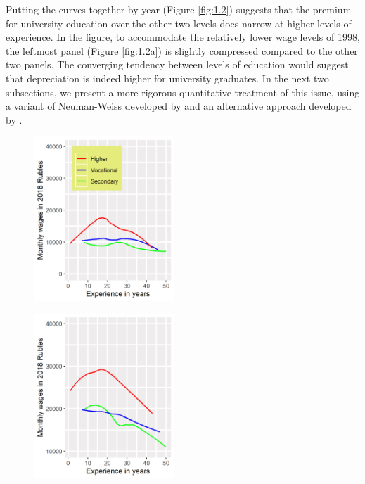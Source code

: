 \documentclass[alpha-refs]{wiley-article-02b}
\begin{document}
Putting the curves together by year (Figure \ref{fig:1.2}) suggests that 
the premium for university education over the other two levels does narrow 
at higher levels of experience. In the figure, to accommodate the 
relatively lower wage levels of 1998, the leftmost panel (Figure 
\ref{fig:1.2a}) is slightly compressed compared to the other two panels. 
The  converging tendency between levels of education would suggest that 
depreciation is indeed higher for university graduates. In the next two 
subsections, we present a more rigorous quantitative treatment of this 
issue, using a variant of Neuman-Weiss developed by \citet{Murillo_2006} 
and an alternative approach developed by \citet{Arrazola_2005}.

\begin{figure}[htbp!]
\hspace{0.35in}
		\begin{minipage}[b]{.3\linewidth}
			\centering
			\hspace*{-0.7in}
			\includegraphics[width=150pt]{dp01_98.png}
			\label{fig:1.2a}
		\end{minipage}
		\hfill
		\begin{minipage}[b]{.3\linewidth}
			\centering
			\hspace*{-0.7in}
			\includegraphics[width=150pt]{dp01_06.png}
			\label{fig:1.2b}

\end{minipage}
\end{figure}
\end{document}
